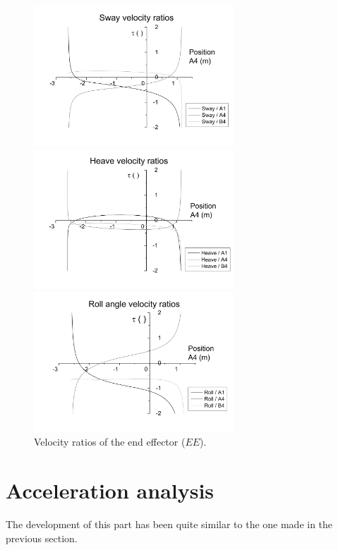 \documentclass[10.5pt, twocolumn]{article}
\begin{document}
\begin{figure}
\centering
\begin{minipage}{0.49\textwidth}
	\includegraphics[width=7.5cm]{Images/Ratio_x}
\end{minipage}
\begin{minipage}{0.49\textwidth}
	\includegraphics[width=7.5cm]{Images/Ratio_y}
\end{minipage}
\begin{minipage}{0.49\textwidth}
	\includegraphics[width=7.5cm]{Images/Ratio_angle}
\end{minipage}
    \caption{Velocity ratios of the end effector (\( EE \)).}
 \label{fig:v_r}
\end{figure}
\clearpage
\restoregeometry




\section{Acceleration analysis}
The development of this part has been quite similar to the one made in the previous section.
\end{document}
